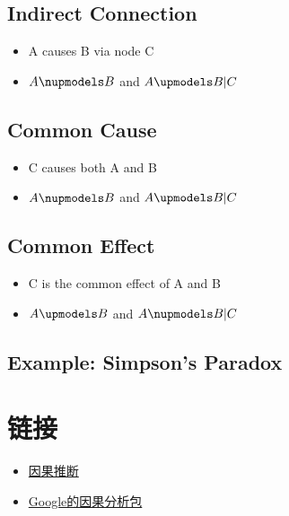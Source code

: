 \documentclass[
]{book}
\providecommand{\tightlist}{%
  \setlength{\itemsep}{0pt}\setlength{\parskip}{0pt}}
\begin{document}
\hypertarget{indirect-connection}{%
\subsection{Indirect Connection}\label{indirect-connection}}

\begin{itemize}
\tightlist
\item
  A causes B via node C
\item
  \(A \nupmodels B\) and \(A \upmodels B|C\)
\end{itemize}

\hypertarget{common-cause}{%
\subsection{Common Cause}\label{common-cause}}

\begin{itemize}
\tightlist
\item
  C causes both A and B
\item
  \(A \nupmodels B\) and \(A \upmodels B|C\)
\end{itemize}

\hypertarget{common-effect}{%
\subsection{Common Effect}\label{common-effect}}

\begin{itemize}
\tightlist
\item
  C is the common effect of A and B
\item
  \(A \upmodels B\) and \(A \nupmodels B|C\)
\end{itemize}

\hypertarget{example-simpsons-paradox}{%
\subsection{Example: Simpson's Paradox}\label{example-simpsons-paradox}}

\hypertarget{yinguolink}{%
\section{链接}\label{yinguolink}}

\begin{itemize}
\tightlist
\item
  \href{https://cosx.org/2012/03/causality1-simpson-paradox}{因果推断}
\item
  \href{https://github.com/google/CausalImpact}{Google的因果分析包}
\end{itemize}
\end{document}

